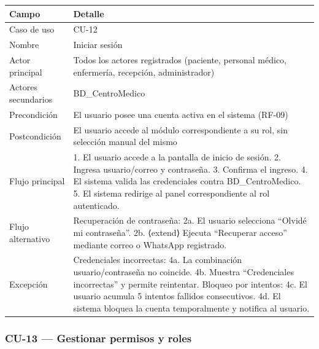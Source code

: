 \documentclass[11pt,a4paper]{article}
\begin{document}
	\begin{longtable}{p{} p{} }
		
		
		\toprule
		\textbf{Campo} &
		\textbf{Detalle}  \\
		\midrule
		\endhead
		
		Caso de uso & CU-12 \\
		Nombre & Iniciar sesión \\
		Actor principal & Todos los actores registrados (paciente, personal médico, enfermería, recepción, administrador) \\
		Actores secundarios & BD\_CentroMedico \\
		Precondición & El usuario posee una cuenta activa en el sistema (RF-09) \\
		Postcondición & El usuario accede al módulo correspondiente a su rol, sin selección manual del mismo \\
		Flujo principal & 1. El usuario accede a la pantalla de inicio de sesión. 2. Ingresa usuario/correo y contraseña. 3. Confirma el ingreso. 4. El sistema valida las credenciales contra BD\_CentroMedico. 5. El sistema redirige al panel correspondiente al rol autenticado. \\
		Flujo alternativo & Recuperación de contraseña: 2a. El usuario selecciona ``Olvidé mi contraseña''. 2b. ⟨extend⟩ Ejecuta ``Recuperar acceso'' mediante correo o WhatsApp registrado. \\
		Excepción & Credenciales incorrectas: 4a. La combinación usuario/contraseña no coincide. 4b. Muestra ``Credenciales incorrectas'' y permite reintentar. Bloqueo por intentos: 4c. El usuario acumula 5 intentos fallidos consecutivos. 4d. El sistema bloquea la cuenta temporalmente y notifica al usuario. \\
		\bottomrule
	\end{longtable}
	
	\subsubsection{CU-13 --- Gestionar permisos y roles}
	
\end{document}
